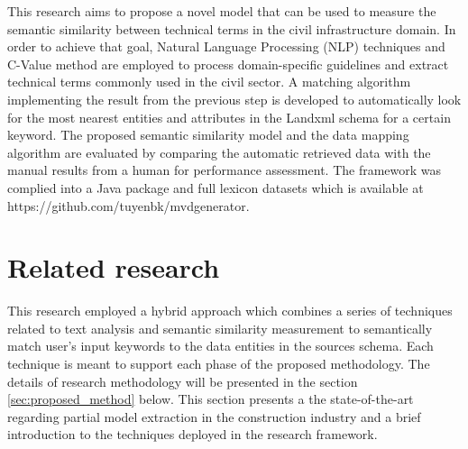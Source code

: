 \documentclass[Journal, InsideFigs, DoubleSpace]{ascelike} %
\begin{document}
\par
This research aims to propose a novel model that can be used to measure the semantic similarity between technical terms in the civil infrastructure domain. In order to achieve that goal, Natural Language Processing (NLP) techniques and C-Value method \cite{frantzi20} are employed to process domain-specific guidelines and extract technical terms commonly used in the civil sector. A matching algorithm implementing the result from the previous step is developed to automatically look for the most nearest entities and attributes in the Landxml schema for a certain keyword. The proposed semantic similarity model and the data mapping algorithm are evaluated by comparing the automatic retrieved data with the manual results from a human for performance assessment. The framework was complied into a Java package and full lexicon datasets which is available at https://github.com/tuyenbk/mvdgenerator.
%
\section{Related research} \label{sec:litrev} %
This research employed a hybrid approach which combines a series of techniques related to text analysis and semantic similarity measurement to semantically match user's input keywords to the data entities in the sources schema. Each technique is meant to support each phase of the proposed methodology. The details of research methodology will be presented in the section \ref{sec:proposed_method} below. This section presents a the state-of-the-art regarding partial model extraction in the construction industry and a brief introduction to the techniques deployed in the research framework.
\end{document}
